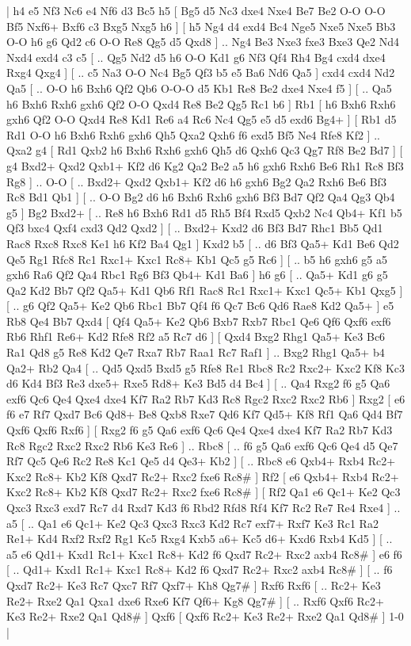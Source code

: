 \makegametitle 
|   h4   e5    Nf3   Nc6    e4   Nf6    d3   Bc5    h5 [  Bg5 d5  Nc3 dxe4  Nxe4 Be7  Be2 O-O  O-O Bf5  Nxf6+ Bxf6  c3 Bxg5  Nxg5 h6   ]  [  h5 Ng4  d4 exd4  Bc4 Nge5  Nxe5 Nxe5  Bb3 O-O  h6 g6  Qd2 c6  O-O Re8  Qg5 d5  Qxd8   ] .. Ng4    Be3   Nxe3    fxe3   Bxe3    Qe2   Nd4    Nxd4   exd4    c3   c5 [ .. Qg5  Nd2 d5  h6 O-O  Kd1 g6  Nf3 Qf4  Rh4 Bg4  cxd4 dxe4  Rxg4 Qxg4   ]  [ .. c5  Na3 O-O  Nc4 Bg5  Qf3 b5  e5 Ba6  Nd6 Qa5   ]  cxd4   cxd4    Nd2   Qa5 [ .. O-O  h6 Bxh6  Qf2 Qb6  O-O-O d5  Kb1 Re8  Be2 dxe4  Nxe4 f5   ]  [ .. Qa5  h6 Bxh6  Rxh6 gxh6  Qf2 O-O  Qxd4 Re8  Be2 Qg5  Rc1 b6   ]  Rb1 [  h6 Bxh6  Rxh6 gxh6  Qf2 O-O  Qxd4 Re8  Kd1 Re6  a4 Rc6  Nc4 Qg5  e5 d5  exd6 Bg4+   ]  [  Rb1 d5  Rd1 O-O  h6 Bxh6  Rxh6 gxh6  Qh5 Qxa2  Qxh6 f6  exd5 Bf5  Ne4 Rfe8  Kf2   ] .. Qxa2    g4 [  Rd1 Qxb2  h6 Bxh6  Rxh6 gxh6  Qh5 d6  Qxh6 Qc3  Qg7 Rf8  Be2 Bd7   ]  [  g4 Bxd2+  Qxd2 Qxb1+  Kf2 d6  Kg2 Qa2  Be2 a5  h6 gxh6  Rxh6 Be6  Rh1 Rc8  Bf3 Rg8   ] .. O-O [ .. Bxd2+  Qxd2 Qxb1+  Kf2 d6  h6 gxh6  Bg2 Qa2  Rxh6 Be6  Bf3 Rc8  Bd1 Qb1   ]  [ .. O-O  Bg2 d6  h6 Bxh6  Rxh6 gxh6  Bf3 Bd7  Qf2 Qa4  Qg3 Qb4  g5   ]  Bg2   Bxd2+ [ .. Re8  h6 Bxh6  Rd1 d5  Rh5 Bf4  Rxd5 Qxb2  Nc4 Qb4+  Kf1 b5  Qf3 bxc4  Qxf4 cxd3  Qd2 Qxd2   ]  [ .. Bxd2+  Kxd2 d6  Bf3 Bd7  Rhc1 Bb5  Qd1 Rac8  Rxc8 Rxc8  Ke1 h6  Kf2 Ba4  Qg1   ]  Kxd2   b5 [ .. d6  Bf3 Qa5+  Kd1 Be6  Qd2 Qe5  Rg1 Rfc8  Rc1 Rxc1+  Kxc1 Rc8+  Kb1 Qc5  g5 Rc6   ]  [ .. b5  h6 gxh6  g5 a5  gxh6 Ra6  Qf2 Qa4  Rbc1 Rg6  Bf3 Qb4+  Kd1 Ba6   ]  h6   g6 [ .. Qa5+  Kd1 g6  g5 Qa2  Kd2 Bb7  Qf2 Qa5+  Kd1 Qb6  Rf1 Rac8  Rc1 Rxc1+  Kxc1 Qc5+  Kb1 Qxg5   ]  [ .. g6  Qf2 Qa5+  Ke2 Qb6  Rbc1 Bb7  Qf4 f6  Qc7 Bc6  Qd6 Rae8  Kd2 Qa5+   ]  e5   Rb8    Qe4   Bb7    Qxd4 [  Qf4 Qa5+  Ke2 Qb6  Bxb7 Rxb7  Rbc1 Qe6  Qf6 Qxf6  exf6 Rb6  Rhf1 Re6+  Kd2 Rfe8  Rf2 a5  Rc7 d6   ]  [  Qxd4 Bxg2  Rhg1 Qa5+  Ke3 Bc6  Ra1 Qd8  g5 Re8  Kd2 Qe7  Rxa7 Rb7  Raa1 Rc7  Raf1   ] .. Bxg2    Rhg1   Qa5+    b4   Qa2+    Rb2   Qa4 [ .. Qd5  Qxd5 Bxd5  g5 Rfe8  Re1 Rbc8  Rc2 Rxc2+  Kxc2 Kf8  Kc3 d6  Kd4 Bf3  Re3 dxe5+  Rxe5 Rd8+  Ke3 Bd5  d4 Bc4   ]  [ .. Qa4  Rxg2 f6  g5 Qa6  exf6 Qc6  Qe4 Qxe4  dxe4 Kf7  Ra2 Rb7  Kd3 Rc8  Rgc2 Rxc2  Rxc2 Rb6   ]  Rxg2 [  e6 f6  e7 Rf7  Qxd7 Bc6  Qd8+ Be8  Qxb8 Rxe7  Qd6 Kf7  Qd5+ Kf8  Rf1 Qa6  Qd4 Bf7  Qxf6 Qxf6  Rxf6   ]  [  Rxg2 f6  g5 Qa6  exf6 Qc6  Qe4 Qxe4  dxe4 Kf7  Ra2 Rb7  Kd3 Rc8  Rgc2 Rxc2  Rxc2 Rb6  Ke3 Re6   ] .. Rbc8    [ .. f6  g5 Qa6  exf6 Qc6  Qe4 d5  Qe7 Rf7  Qc5 Qe6  Rc2 Re8  Kc1 Qe5  d4 Qe3+  Kb2   ]  [ .. Rbc8  e6 Qxb4+  Rxb4 Rc2+  Kxc2 Rc8+  Kb2 Kf8  Qxd7 Rc2+  Rxc2 fxe6  Rc8#   ]  Rf2 [  e6 Qxb4+  Rxb4 Rc2+  Kxc2 Rc8+  Kb2 Kf8  Qxd7 Rc2+  Rxc2 fxe6  Rc8#   ]  [  Rf2 Qa1  e6 Qc1+  Ke2 Qc3  Qxc3 Rxc3  exd7 Rc7  d4 Rxd7  Kd3 f6  Rbd2 Rfd8  Rf4 Kf7  Rc2 Re7  Re4 Rxe4   ] .. a5    [ .. Qa1  e6 Qc1+  Ke2 Qc3  Qxc3 Rxc3  Kd2 Rc7  exf7+ Rxf7  Ke3 Rc1  Ra2 Re1+  Kd4 Rxf2  Rxf2 Rg1  Kc5 Rxg4  Kxb5 a6+  Kc5 d6+  Kxd6 Rxb4  Kd5   ]  [ .. a5  e6 Qd1+  Kxd1 Rc1+  Kxc1 Rc8+  Kd2 f6  Qxd7 Rc2+  Rxc2 axb4  Rc8#   ]  e6   f6    [ .. Qd1+  Kxd1 Rc1+  Kxc1 Rc8+  Kd2 f6  Qxd7 Rc2+  Rxc2 axb4  Rc8#   ]  [ .. f6  Qxd7 Rc2+  Ke3 Rc7  Qxc7 Rf7  Qxf7+ Kh8  Qg7#   ]  Rxf6   Rxf6    [ .. Rc2+  Ke3 Re2+  Rxe2 Qa1  Qxa1 dxe6  Rxe6 Kf7  Qf6+ Kg8  Qg7#   ]  [ .. Rxf6  Qxf6 Rc2+  Ke3 Re2+  Rxe2 Qa1  Qd8#   ]  Qxf6    [  Qxf6 Rc2+  Ke3 Re2+  Rxe2 Qa1  Qd8#   ] 1-0  |
